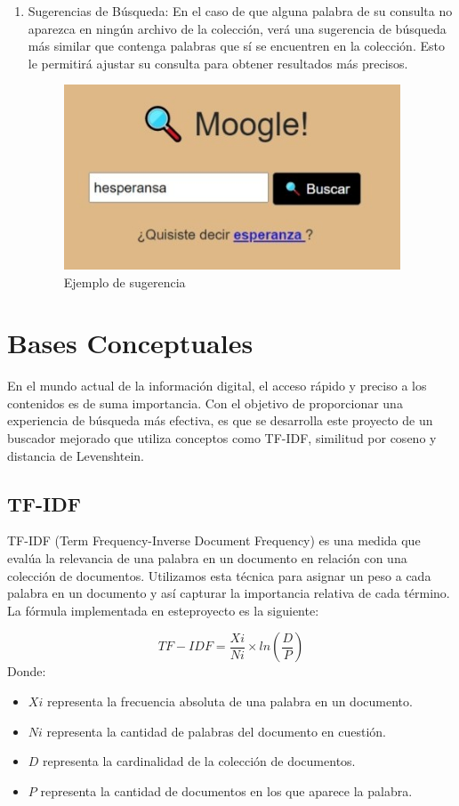 \documentclass[a4paper, 12pt]{article}
\begin{document}
\begin{enumerate}
\item Sugerencias de Búsqueda:
   En el caso de que alguna palabra de su consulta no aparezca en ningún archivo de la colección, verá una sugerencia de búsqueda más similar que contenga palabras que sí se encuentren en la colección. Esto le permitirá ajustar su consulta para obtener resultados más precisos.

\begin{figure}[h]
       \center
       \includegraphics[width=10cm]{Web3.jpg}
       \caption{Ejemplo de sugerencia}
       \label{fig:suggestion}
\end{figure}
\end{enumerate}





\newpage
\section{Bases Conceptuales}\label{sec;base}
En el mundo actual de la información digital, el acceso rápido y preciso a los contenidos es de suma importancia. Con el objetivo de proporcionar una experiencia de búsqueda más efectiva, es que se desarrolla este proyecto de un buscador mejorado que utiliza conceptos como TF-IDF, similitud por coseno y distancia de Levenshtein.

\subsection{TF-IDF}
TF-IDF (Term Frequency-Inverse Document Frequency) es una medida que evalúa la relevancia de una palabra en un documento en relación con una colección de documentos. Utilizamos esta técnica para asignar un peso a cada palabra en un documento y así capturar la importancia relativa de cada término. La fórmula implementada en esteproyecto es la siguiente:

\[TF-IDF = \frac{Xi}{Ni} \times ln\left(\frac{D}{P}\right)\]
Donde:
\begin{itemize}
\item $Xi$
representa la frecuencia absoluta de una palabra en un documento.
\item $Ni$
representa la cantidad de palabras del documento en cuestión.
\item $D$
representa la cardinalidad de la colección de documentos.
\item $P$
representa la cantidad de documentos en los que aparece la palabra.
\end{itemize}
\end{document}
